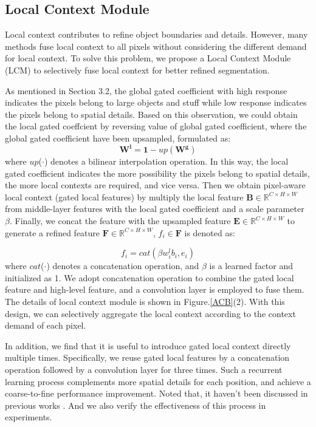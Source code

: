 \documentclass[10pt,twocolumn,letterpaper]{article}
\begin{document}
\subsection{Local Context Module}
Local context contributes to refine object boundaries and details. However, many methods fuse local context  to  all pixels without considering the different demand for local context.
To solve this problem, we propose
a Local Context Module (LCM) to selectively fuse local context for better refined segmentation.

As mentioned  in Section 3.2,  the  global gated coefficient with high response indicates the pixels belong to large objects and stuff while low response indicates the pixels belong to spatial details. Based on this observation, we could obtain the local gated coeffcient by reversing value of global gated coefficient, where the global gated coefficient have been upsampled, formulated as:
\begin{equation}
\mathbf{W^l} =\mathbf{1}-up(\mathbf{W^g})
\end{equation}
where $up$($\cdot$) denotes a bilinear interpolation operation.
In this way, the local gated coefficient indicates the more possibility the pixels belong to spatial details, the more local contexts are required, and vice versa. Then we obtain pixel-aware local context (gated local features) by multiply the local feature $\mathbf{B}\in \mathbb{R}^{C \times H \times W}$ from middle-layer features with  the local gated coefficient and a scale parameter $\beta $. Finally, we concat the feature with the upsampled feature $\mathbf{E}\in \mathbb{R}^{C \times H \times W}$ to generate a refined feature $\mathbf{F}\in \mathbb{R}^{C \times H \times W}$, ${f_{i} \in \mathbf{F}}$ is denoted as:

\begin{equation}
f_{i} =  cat( \beta w^l_{i}b_{i},e_{i})
\label{equ1}\end{equation}
where $cat$($\cdot$) denotes a concatenation operation, and $\beta$ is a learned factor  and  initialized as 1. We adopt concatenation operation to combine the gated local feature and high-level feature, and  a convolution layer is employed to fuse them. The details of local context module is shown in Figure.\ref{ACB}(2).
With this design, we can selectively aggregate the local context according to the  context demand of each pixel.


In addition, we find that it is useful to introduce gated local context directly multiple times. Specifically, we reuse gated local features by  
a concatenation operation followed by  a convolution layer for three times.
Such a recurrent learning process complements more spatial details for each position, and achieve a coarse-to-fine performance improvement.  Noted that, it haven't been discussed in previous works \cite{refinenet, exfuse,yu2015multi,chen2018encoder}. And we also  verify the effectiveness of this process in experiments.
\end{document}
